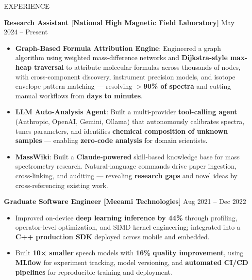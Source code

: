 \documentclass{resume} %
\begin{document}
\begin{rSection}{EXPERIENCE}
\vspace{-1.25em}

\item \textbf{Research Assistant [National High Magnetic Field Laboratory]} \hfill {May 2024 -- Present}
\begin{itemize}
    \itemsep -3pt {}
    \item \textbf{Graph-Based Formula Attribution Engine}: Engineered a graph algorithm using weighted mass-difference networks and \textbf{Dijkstra-style max-heap traversal} to attribute molecular formulas across thousands of nodes, with cross-component discovery, instrument precision models, and isotope envelope pattern matching — resolving \textbf{$>$90\% of spectra} and cutting manual workflows from \textbf{days to minutes}.

    \item \textbf{LLM Auto-Analysis Agent}: Built a multi-provider \textbf{tool-calling agent} (Anthropic, OpenAI, Gemini, Ollama) that autonomously calibrates spectra, tunes parameters, and identifies \textbf{chemical composition of unknown samples} — enabling \textbf{zero-code analysis} for domain scientists.

    \item \textbf{MassWiki}: Built a \textbf{Claude-powered} skill-based knowledge base for mass spectrometry research. Natural-language commands drive paper ingestion, cross-linking, and auditing — revealing \textbf{research gaps} and novel ideas by cross-referencing existing work.
\end{itemize}

\item \textbf{Graduate Software Engineer [Meeami Technologies]} \hfill {Aug 2021 -- Dec 2022}
\begin{itemize}
    \itemsep -3pt {}
    \item Improved on-device \textbf{deep learning inference by 44\%} through profiling, operator-level optimization, and SIMD kernel engineering; integrated into a \textbf{C++ production SDK} deployed across mobile and embedded.

    \item Built \textbf{10× smaller} speech models with \textbf{16\% quality improvement}, using \textbf{MLflow} for experiment tracking, model versioning, and \textbf{automated CI/CD pipelines} for reproducible training and deployment.
\end{itemize}
\end{rSection}
\end{document}
